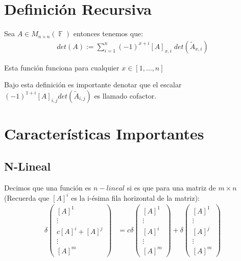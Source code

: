 \documentclass[12pt, fleqn]{report}                             %
\theoremstyle{break}                                            %
\DeclareMathOperator \GenericField {\mathbb{F}}                 %
\newcommand{\Brackets}[1]    {\left[ #1 \right]}                %
\newcommand{\pVector}[1]                                        %
        { \ensuremath{\begin{pmatrix}#1\end{pmatrix}} }             %
\begin{document}
        \vspace{1em}
        \section{Definición Recursiva}

            Sea $A \in M_{n \times n}(\GenericField)$ entonces tenemos que:
            \begin{align*}
                det(A) := \sum_{i = 1}^n (-1)^{x + i} [A]_{x, i} \; det(\tilde A_{x, i})
            \end{align*}

            Esta función funciona para cualquier $x \in [1, \dots, n]$

            Bajo esta definición es importante denotar que el escalar 
            $(-1)^{1 + i} [A]_{i, j} det(\tilde A_{i, j})$ es llamado cofactor.



        \clearpage
        \section{Características Importantes}


            \subsection{N-Lineal}

                Decimos que una función es $n-lineal$ si es que para una matriz de $m \times n$
                (Recuerda que $[A]^i$ es la i-ésima fila horizontal de la matriz):
                \begin{align*}
                    \delta\pVector{\Brackets{A}^1 \\ \vdots \\ c\Brackets{A}^i + \Brackets{A}^j \\ \vdots \\ \Brackets{A}^m}
                        &= c
                        \delta\pVector{\Brackets{A}^1 \\ \vdots \\ \Brackets{A}^i \\ \vdots \\ \Brackets{A}^m}
                        + \delta\pVector{\Brackets{A}^1 \\ \vdots \\ \Brackets{A}^j \\ \vdots \\ \Brackets{A}^m}
                \end{align*}
\end{document}
